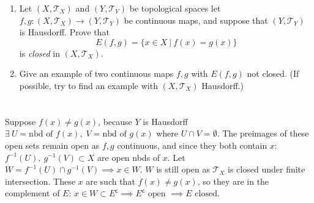 \documentclass{jhwhw}
\newcommand{\T}{{\mathcal T}}
\begin{document}
\problem{} %
\begin{enumerate}
	\item Let $(X,\T_X)$ and $(Y,\T_Y)$ be topological spaces let $f,g:(X,\T_X)\to(Y,\T_Y)$ be continuous maps, and suppose that $(Y,\T_Y)$ is Hausdorff.   Prove that
	$$
	E(f,g) = \{x\in X \  | \  f(x) = g(x) \}
	$$
	is \emph{closed} in $(X,\T_X)$.
	\item Give an example of two continuous maps $f,g$ with $E(f,g)$ not closed.  (If possible, try to find an example with $(X,\T_X)$ 
	Hausdorff.)
\end{enumerate}

\solution{}

\part{}
Suppose $f(x) \neq g(x)$, because $Y$ is Hausdorff $\exists\: U = \text{nbd } \text{of } f(x),\; V=\text{nbd } \text{of } g(x)$ where $U\cap V=\emptyset$. The preimages of these open sets remain open as $f,g$ continuous, and since they both contain $x$: $f^{-1}(U),\:g^{-1}(V)\subset X$ are open nbds of $x$. Let $W=f^{-1}(U)\cap g^{-1}(V) \implies x\in W$. $W$ is still open as $\T_X$ is closed under finite intersection. These $x$ are such that $f(x)\neq g(x)$, so they are in the complement of $E$: $x\in W\subset E^{\mathsf{c}} \implies E^{\mathsf{c}} \text{ open } \implies E \text{ closed}$. 


\part{}
\end{document}
